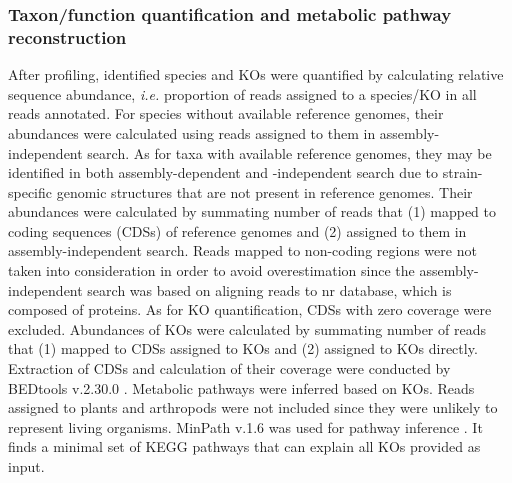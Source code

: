 \documentclass[11pt]{article}
\begin{document}
      \subsubsection{Taxon/function quantification and metabolic pathway reconstruction}
      After profiling, identified species and KOs were quantified by calculating relative sequence abundance, \textit{i.e.} proportion of reads assigned to a species/KO in all reads annotated. 
      For species without available reference genomes, their abundances were calculated using reads assigned to them in assembly-independent search. 
      As for taxa with available reference genomes, they may be identified in both assembly-dependent and -independent search due to strain-specific genomic structures that are not present in reference genomes. 
      Their abundances were calculated by summating number of reads that (1) mapped to coding sequences (CDSs) of reference genomes and (2) assigned to them in assembly-independent search. 
      Reads mapped to non-coding regions were not taken into consideration in order to avoid overestimation since the assembly-independent search was based on aligning reads to nr database, which is composed of proteins. 
      As for KO quantification, CDSs with zero coverage were excluded. 
      Abundances of KOs were calculated by summating number of reads that (1) mapped to CDSs assigned to KOs and (2) assigned to KOs directly. 
      Extraction of CDSs and calculation of their coverage were conducted by BEDtools v.2.30.0 \citep{quinlan2010bedtools}.
      \newline
      Metabolic pathways were inferred based on KOs. 
      Reads assigned to plants and arthropods were not included since they were unlikely to represent living organisms. 
      MinPath v.1.6 was used for pathway inference \citep{ye2009parsimony}. 
      It finds a minimal set of KEGG pathways that can explain all KOs provided as input. 
\end{document}
